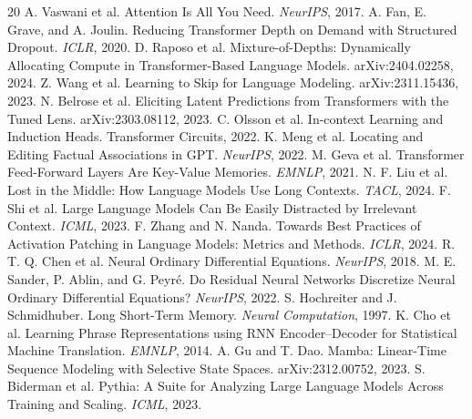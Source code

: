 \documentclass[10pt]{article}
\begin{document}
\begin{thebibliography}{20}
 A. Vaswani et al. Attention Is All You Need. \emph{NeurIPS}, 2017.
 A. Fan, E. Grave, and A. Joulin. Reducing Transformer Depth on Demand with Structured Dropout. \emph{ICLR}, 2020.
 D. Raposo et al. Mixture-of-Depths: Dynamically Allocating Compute in Transformer-Based Language Models. arXiv:2404.02258, 2024.
 Z. Wang et al. Learning to Skip for Language Modeling. arXiv:2311.15436, 2023.
 N. Belrose et al. Eliciting Latent Predictions from Transformers with the Tuned Lens. arXiv:2303.08112, 2023.
 C. Olsson et al. In-context Learning and Induction Heads. Transformer Circuits, 2022.
 K. Meng et al. Locating and Editing Factual Associations in GPT. \emph{NeurIPS}, 2022.
 M. Geva et al. Transformer Feed-Forward Layers Are Key-Value Memories. \emph{EMNLP}, 2021.
 N. F. Liu et al. Lost in the Middle: How Language Models Use Long Contexts. \emph{TACL}, 2024.
 F. Shi et al. Large Language Models Can Be Easily Distracted by Irrelevant Context. \emph{ICML}, 2023.
 F. Zhang and N. Nanda. Towards Best Practices of Activation Patching in Language Models: Metrics and Methods. \emph{ICLR}, 2024.
 R. T. Q. Chen et al. Neural Ordinary Differential Equations. \emph{NeurIPS}, 2018.
 M. E. Sander, P. Ablin, and G. Peyr\'e. Do Residual Neural Networks Discretize Neural Ordinary Differential Equations? \emph{NeurIPS}, 2022.
 S. Hochreiter and J. Schmidhuber. Long Short-Term Memory. \emph{Neural Computation}, 1997.
 K. Cho et al. Learning Phrase Representations using RNN Encoder--Decoder for Statistical Machine Translation. \emph{EMNLP}, 2014.
 A. Gu and T. Dao. Mamba: Linear-Time Sequence Modeling with Selective State Spaces. arXiv:2312.00752, 2023.
 S. Biderman et al. Pythia: A Suite for Analyzing Large Language Models Across Training and Scaling. \emph{ICML}, 2023.
\end{thebibliography}
\end{document}
